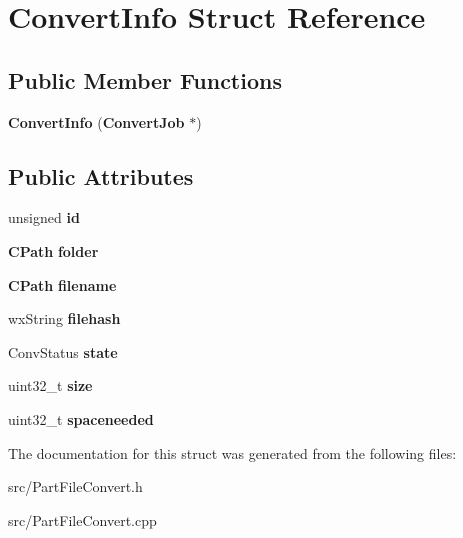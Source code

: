 \section{ConvertInfo Struct Reference}
\label{structConvertInfo}
\subsection*{Public Member Functions}
\begin{DoxyCompactItemize}
\item 
{\bfseries ConvertInfo} ({\bf ConvertJob} $\ast$)\label{structConvertInfo_a246fbc95f5651e0b74fa6b0ad17fb9bb}

\end{DoxyCompactItemize}
\subsection*{Public Attributes}
\begin{DoxyCompactItemize}
\item 
unsigned {\bfseries id}\label{structConvertInfo_ab75da87b4a9dad03c1deb3e16b18bf64}

\item 
{\bf CPath} {\bfseries folder}\label{structConvertInfo_acf026177d5f521b723c9e8aa0ed9114d}

\item 
{\bf CPath} {\bfseries filename}\label{structConvertInfo_a537b2fd53c1072553823f4e1079686a4}

\item 
wxString {\bfseries filehash}\label{structConvertInfo_a2651d8c492535b22106ef5b460b0adb7}

\item 
ConvStatus {\bfseries state}\label{structConvertInfo_a9f5013da0ac07738d5029a9617cd7e8e}

\item 
uint32\_\-t {\bfseries size}\label{structConvertInfo_af0e8011716add023a47892d3cc2c759d}

\item 
uint32\_\-t {\bfseries spaceneeded}\label{structConvertInfo_a2c816d7720a345d5125215b07a4c04c4}

\end{DoxyCompactItemize}


The documentation for this struct was generated from the following files:\begin{DoxyCompactItemize}
\item 
src/PartFileConvert.h\item 
src/PartFileConvert.cpp\end{DoxyCompactItemize}

